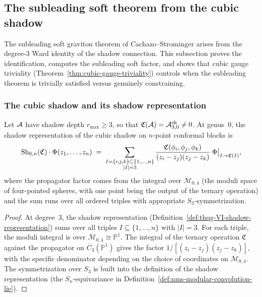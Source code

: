 \subsection{The subleading soft theorem from the cubic shadow}
\label{subsec:thqg-VI-subleading-soft}

The subleading soft graviton theorem of Cachazo--Strominger
arises from the degree-$3$ Ward identity of the shadow connection.
This subsection proves the identification, computes the subleading
soft factor, and shows that cubic gauge triviality
(Theorem~\ref{thm:cubic-gauge-triviality}) controls when the
subleading theorem is trivially satisfied versus genuinely
constraining.

\subsubsection{The cubic shadow and its shadow representation}

\begin{proposition}
\label{prop:thqg-VI-cubic-action}
Let $\mathcal{A}$ have shadow depth $r_{\max} \geq 3$, so that
$\mathfrak{C}(\mathcal{A}) = \mathcal{A}^{\mathrm{sh}}_{3,0} \neq 0$.
At genus~$0$, the shadow representation of the cubic shadow on
$n$-point conformal blocks is
\begin{equation}\label{eq:thqg-VI-cubic-genus0}
\operatorname{Sh}_{0,n}(\mathfrak{C}) \cdot \Phi(z_1, \dotsc, z_n)
\;=\;
\sum_{\substack{I = \{i,j,k\} \subseteq \{1,\dotsc,n\} \\
 |I| = 3}}
\frac{\mathfrak{C}(\phi_i, \phi_j, \phi_k)}
 {(z_i - z_j)(z_j - z_k)}\;
\Phi\bigl|_{I \to \mathfrak{C}(I)},
\end{equation}
where the propagator factor comes from the integral over
$\overline{\mathcal{M}}_{0,4}$ (the moduli space of four-pointed
spheres, with one point being the output of the ternary operation)
and the sum runs over all ordered triples with appropriate
$S_3$-symmetrization.
\end{proposition}

\begin{proof}
At degree~$3$, the shadow representation
(Definition~\ref{def:thqg-VI-shadow-representation}) sums over
all triples $I \subseteq \{1,\dotsc,n\}$ with $|I| = 3$.
For each triple, the moduli integral is over
$\overline{\mathcal{M}}_{0,4} \cong \mathbb{P}^1$.
The integral of the ternary operation $\mathfrak{C}$ against the
propagator on $\overline{C}_3(\mathbb{P}^1)$ gives the factor
$1/[(z_i - z_j)(z_j - z_k)]$, with the specific denominator
depending on the choice of coordinates on
$\overline{\mathcal{M}}_{0,4}$. The symmetrization over $S_3$
is built into the definition of the shadow representation
(the $S_n$-equivariance in
Definition~\ref{def:nms-modular-convolution-lie}).
\end{proof}

